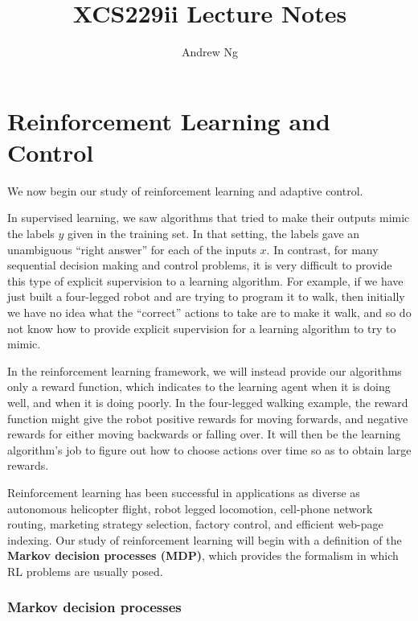 \documentclass{article}
\begin{document}
\title{XCS229ii Lecture Notes}
\author{Andrew Ng}
\date{}
\maketitle


\setcounter{part}{12}
\part{Reinforcement Learning and Control}

We now begin our study of reinforcement learning and adaptive control.

In supervised learning, we saw algorithms that tried to make their outputs
mimic the labels $y$ given in the training set.  In that setting, the labels
gave an unambiguous
``right answer'' for each of the inputs $x$.  In contrast, for many sequential
decision making and control problems, it is very difficult to provide this
type of
explicit supervision to a learning algorithm.  For example, if we
have just built a four-legged robot and are trying to program it to walk, then
initially we have no idea what the ``correct'' actions to take are to make it
walk, and so do not
know how to provide explicit supervision for a learning algorithm to try to mimic.

In the reinforcement learning framework, we will instead provide our algorithms
only a reward function, which indicates to the learning agent when it
is doing well, and when it is doing poorly.
In the four-legged walking example, the reward function might give the
robot positive rewards for moving forwards, and negative rewards for
either moving backwards or falling over.  It will then be the learning
algorithm's job to figure out how to choose actions over time so as
to obtain large rewards.

Reinforcement learning has been successful in applications as diverse as
autonomous helicopter flight, robot legged locomotion, cell-phone network
routing, marketing strategy selection, factory control, and efficient
web-page indexing.
Our study of reinforcement learning will begin with a definition of the
{\bf Markov decision processes (MDP)}, which provides the formalism in which
RL problems are usually posed.

\section{Markov decision processes}
\end{document}
